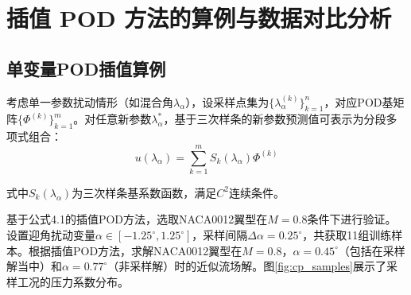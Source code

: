 \chapter{插值 POD 方法的算例与数据对比分析}
\label{cha:usage-example}

\section{单变量POD插值算例}
\label{sec:single_variable_pod}

考虑单一参数扰动情形（如混合角$\lambda_\alpha$），设采样点集为$\{\lambda_{\alpha}^{(k)}\}_{k=1}^n$，对应POD基矩阵$\{\Phi^{(k)}\}_{k=1}^m$。对任意新参数$\lambda_\alpha^*$，基于三次样条的新参数预测值可表示为分段多项式组合：
\begin{equation}
    u(\lambda_\alpha) = \sum_{k=1}^{m} S_k(\lambda_\alpha) \Phi^{(k)}
\end{equation}

式中$S_k(\lambda_\alpha)$为三次样条基系数函数，满足$C^2$连续条件。

基于公式4.1的插值POD方法，选取NACA0012翼型在$M=0.8$条件下进行验证。设置迎角扰动变量$\alpha\in[-1.25^\circ,1.25^\circ]$，采样间隔$\Delta\alpha=0.25^\circ$，共获取11组训练样本。根据插值POD方法，求解NACA0012翼型在$M=0.8$，$\alpha=0.45^\circ$（包括在采样解当中）和$\alpha=0.77^\circ$（非采样解）时的近似流场解。图\ref{fig:cp_samples}展示了采样工况的压力系数分布。

